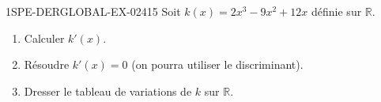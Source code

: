 \begin{exercice}{1SPE-DERGLOBAL-EX-024}{1}{5}
Soit $k(x) = 2x^3 - 9x^2 + 12x$ définie sur $\mathbb{R}$.
\begin{enumerate}
\item Calculer $k'(x)$.
\item Résoudre $k'(x) = 0$ (on pourra utiliser le discriminant).
\item Dresser le tableau de variations de $k$ sur $\mathbb{R}$.
\end{enumerate}
\end{exercice}
